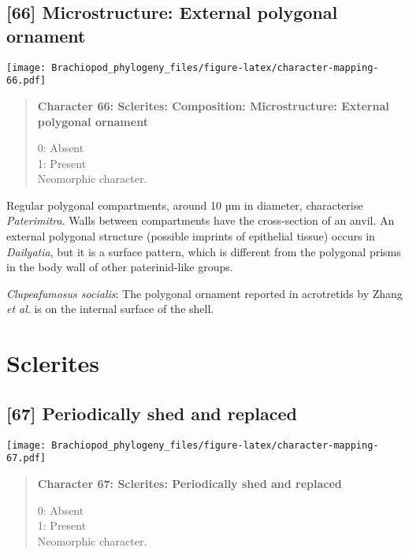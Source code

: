 \documentclass[openany]{book}
\theoremstyle{definition}
\theoremstyle{definition}
\theoremstyle{definition}
\theoremstyle{remark}
\begin{document}
\subsection*{{[}66{]} Microstructure: External polygonal
ornament}\label{microstructure-external-polygonal-ornament}

\texttt{[image: Brachiopod\_phylogeny\_files/figure-latex/character-mapping-66.pdf]}

\begin{quote}
\textbf{Character 66: Sclerites: Composition: Microstructure: External
polygonal ornament}

0: Absent\\
1: Present\\
Neomorphic character.
\end{quote}

Regular polygonal compartments, around 10 µm in diameter, characterise
\emph{Paterimitra}. Walls between compartments have the cross-section of
an anvil. An external polygonal structure (possible imprints of
epithelial tissue) occurs in \emph{Dailyatia}, but it is a surface
pattern, which is different from the polygonal prisms in the body wall
of other paterinid-like groups.

\hypertarget{Clupeafumosus_socialis-coding-66}{}
\emph{Clupeafumosus socialis}: The polygonal ornament reported in
acrotretids by Zhang \emph{et al}. \citeyearpar{Zhang2016Epithelialcell}
is on the internal surface of the shell.

\section{Sclerites}\label{sclerites-1}

\subsection*{{[}67{]} Periodically shed and
replaced}\label{periodically-shed-and-replaced}

\texttt{[image: Brachiopod\_phylogeny\_files/figure-latex/character-mapping-67.pdf]}

\begin{quote}
\textbf{Character 67: Sclerites: Periodically shed and replaced}

0: Absent\\
1: Present\\
Neomorphic character.
\end{quote}
\end{document}
